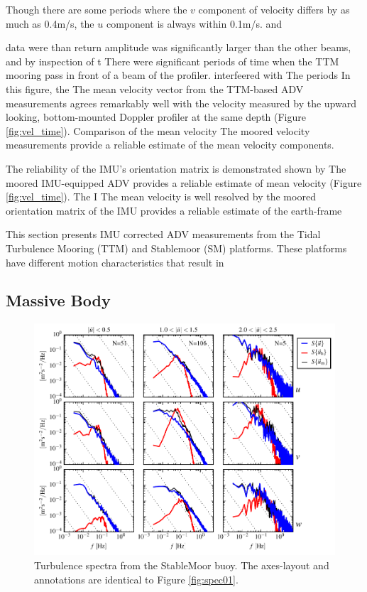 \documentclass[twocol]{ametsoc}
\begin{document}
Though there are some periods where the $v$ component of velocity differs by as much as 0.4m/s, the $u$ component is always within 0.1m/s. and 


 data were  than return amplitude was significantly larger than the other beams, and  by inspection of t  There were significant periods of time when the TTM mooring pass in front of a beam of the profiler. interfeered with The periods In this figure, the 
The mean velocity vector from the TTM-based ADV measurements agrees remarkably well with the velocity measured by the upward looking, bottom-mounted Doppler profiler at the same depth (Figure \ref{fig:vel_time}). 
Comparison of the mean velocity The moored velocity measurements provide a reliable estimate of the mean velocity components. 

The reliability of the IMU's orientation matrix is demonstrated shown by 
The moored IMU-equipped ADV provides a reliable estimate of mean velocity (Figure \ref{fig:vel_time}).  The I
The mean velocity is well resolved by the moored orientation matrix of the IMU provides a reliable estimate of the earth-frame

This section presents IMU corrected ADV measurements from the Tidal Turbulence Mooring (TTM) and Stablemoor (SM) platforms. These platforms have different motion characteristics that result in  \cite{Harding_MotionPaper}

\subsection{Massive Body}

\begin{figure}[t]
  \centering
  \includegraphics{SpecFig02_SMnose}
  \caption{Turbulence spectra from the StableMoor buoy. The axes-layout and annotations are identical to Figure \ref{fig:spec01}.}
\end{figure}
\end{document}
